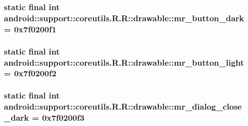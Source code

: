 \hypertarget{classandroid_1_1support_1_1coreutils_1_1_r_1_1drawable_10a1acb3cdb22f9cc7f72ecb0f5c5dd9}{
\subsubsection[{mr\_\-button\_\-dark}]{\setlength{\rightskip}{0pt plus 5cm}static final int android::support::coreutils.R.R::drawable::mr\_\-button\_\-dark = 0x7f0200f1}}
\label{classandroid_1_1support_1_1coreutils_1_1_r_1_1drawable_10a1acb3cdb22f9cc7f72ecb0f5c5dd9}


\hypertarget{classandroid_1_1support_1_1coreutils_1_1_r_1_1drawable_f24f45db9216572dc4d621f5af4b2538}{
\subsubsection[{mr\_\-button\_\-light}]{\setlength{\rightskip}{0pt plus 5cm}static final int android::support::coreutils.R.R::drawable::mr\_\-button\_\-light = 0x7f0200f2}}
\label{classandroid_1_1support_1_1coreutils_1_1_r_1_1drawable_f24f45db9216572dc4d621f5af4b2538}


\hypertarget{classandroid_1_1support_1_1coreutils_1_1_r_1_1drawable_149e0319bfbc9ef2cdcf7b00d9603ce6}{
\subsubsection[{mr\_\-dialog\_\-close\_\-dark}]{\setlength{\rightskip}{0pt plus 5cm}static final int android::support::coreutils.R.R::drawable::mr\_\-dialog\_\-close\_\-dark = 0x7f0200f3}}
\label{classandroid_1_1support_1_1coreutils_1_1_r_1_1drawable_149e0319bfbc9ef2cdcf7b00d9603ce6}



